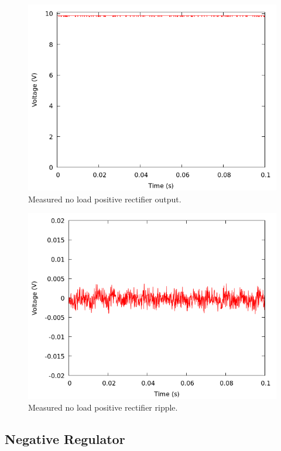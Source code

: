 \documentclass[12pt]{article}
\newcommand{\graphwidth}{0.5\linewidth}
\begin{document}
\begin{appendix}
\begin{figure}[H]
    \centering
    \includegraphics[width=\graphwidth]{./res/image/pos-noload.png}
    \caption{Measured no load positive rectifier output.}
    \label{fig:pos_noload}
\end{figure}

\begin{figure}[H]
    \centering
    \includegraphics[width=\graphwidth]{./res/image/pos-noload-ripple.png}
    \caption{Measured no load positive rectifier ripple.}
    \label{fig:pos_noload_ripple}
\end{figure}

\newpage

\subsection{Negative Regulator}


\end{appendix}
\end{document}
